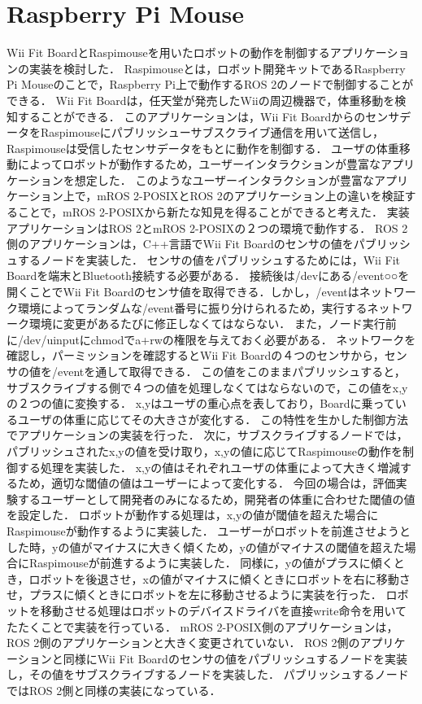 \section{Raspberry Pi Mouse}
Wii Fit BoardとRaspimouseを用いたロボットの動作を制御するアプリケーションの実装を検討した．
Raspimouseとは，ロボット開発キットであるRaspberry Pi Mouseのことで，Raspberry Pi上で動作するROS 2のノードで制御することができる．
Wii Fit Boardは，任天堂が発売したWiiの周辺機器で，体重移動を検知することができる．
このアプリケーションは，Wii Fit BoardからのセンサデータをRaspimouseにパブリッシューサブスクライブ通信を用いて送信し，Raspimouseは受信したセンサデータをもとに動作を制御する．
ユーザの体重移動によってロボットが動作するため，ユーザーインタラクションが豊富なアプリケーションを想定した．
このようなユーザーインタラクションが豊富なアプリケーション上で，mROS 2-POSIXとROS 2のアプリケーション上の違いを検証することで，mROS 2-POSIXから新たな知見を得ることができると考えた．
実装アプリケーションはROS 2とmROS 2-POSIXの２つの環境で動作する．
ROS 2側のアプリケーションは，C++言語でWii Fit Boardのセンサの値をパブリッシュするノードを実装した．
センサの値をパブリッシュするためには，Wii Fit Boardを端末とBluetooth接続する必要がある．
接続後は/devにある/event○○を開くことでWii Fit Boardのセンサ値を取得できる．しかし，/eventはネットワーク環境によってランダムな/event番号に振り分けられるため，実行するネットワーク環境に変更があるたびに修正しなくてはならない．
また，ノード実行前に/dev/uinputにchmodでa+rwの権限を与えておく必要がある．
ネットワークを確認し，パーミッションを確認するとWii Fit Boardの４つのセンサから，センサの値を/eventを通して取得できる．
この値をこのままパブリッシュすると，サブスクライブする側で４つの値を処理しなくてはならないので，この値をx,yの２つの値に変換する．
x,yはユーザの重心点を表しており，Boardに乗っているユーザの体重に応じてその大きさが変化する．
この特性を生かした制御方法でアプリケーションの実装を行った．
次に，サブスクライブするノードでは，パブリッシュされたx,yの値を受け取り，x,yの値に応じてRaspimouseの動作を制御する処理を実装した．
x,yの値はそれぞれユーザの体重によって大きく増減するため，適切な閾値の値はユーザーによって変化する．
今回の場合は，評価実験するユーザーとして開発者のみになるため，開発者の体重に合わせた閾値の値を設定した．
ロボットが動作する処理は，x,yの値が閾値を超えた場合にRaspimouseが動作するように実装した．
ユーザーがロボットを前進させようとした時，yの値がマイナスに大きく傾くため，yの値がマイナスの閾値を超えた場合にRaspimouseが前進するように実装した．
同様に，yの値がプラスに傾くとき，ロボットを後退させ，xの値がマイナスに傾くときにロボットを右に移動させ，プラスに傾くときにロボットを左に移動させるように実装を行った．
ロボットを移動させる処理はロボットのデバイスドライバを直接write命令を用いてたたくことで実装を行っている．
mROS 2-POSIX側のアプリケーションは，ROS 2側のアプリケーションと大きく変更されていない．
ROS 2側のアプリケーションと同様にWii Fit Boardのセンサの値をパブリッシュするノードを実装し，その値をサブスクライブするノードを実装した．
パブリッシュするノードではROS 2側と同様の実装になっている．
